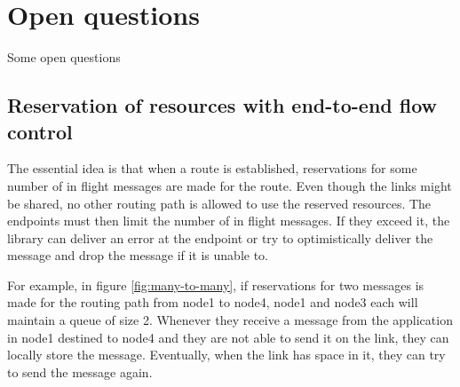\documentclass[a4paper,twoside]{report} %
\begin{document}






\section{Open questions}
Some open questions

\subsection{Reservation of resources with end-to-end flow control}
The essential idea is that when a route is established,
reservations for some number of in flight messages are made for the route.
Even though the links might be shared,
no other routing path is allowed to use the reserved resources.
The endpoints must then limit the number of in flight messages.
If they exceed it, the library can deliver an error at the endpoint or try to
optimistically deliver the message and drop the message if it is unable to.

For example, in figure \ref{fig:many-to-many},
if reservations for two messages is made for the routing path
from node1 to node4, node1 and node3 each will maintain a queue of size 2.
Whenever they receive a message from the application in node1 destined to node4
and they are not able to send it on the link,
they can locally store the message.
Eventually, when the link has space in it,
they can try to send the message again.
\end{document}
